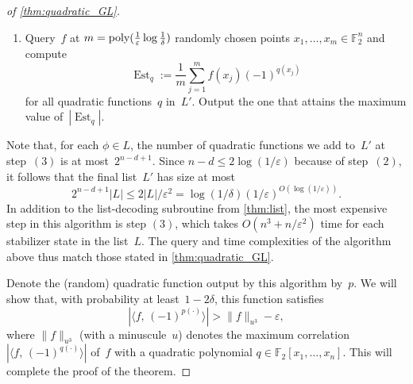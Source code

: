 \documentclass[10pt,a4paper]{amsart}
\DeclareMathOperator{\Est}{Est}
\newcommand{\F}{\mathbb{F}} %
\newcommand{\eps}{\varepsilon}
\newcommand{\pmset}[1]{\{-1,1\}^{#1}} %
\newcommand{\poly}{\mbox{\rm poly}}
\begin{document}
\begin{proof}[ of \cref{thm:quadratic_GL}]
\begin{enumerate}
\begin{itemize}
        \item[$(b)$] If $c\notin V^\perp$, let $U = \{c\}^\perp$ and let $v\in \F_2^n$ satisfy $c\cdot v = 1$, so that any $x\in\F_2^n$ has a unique representation of the form $x = z+bv$ for some $z\in U$ and $b\in \F_2$.
        By evaluating the map $x = z+bv \mapsto i^{|c\circ z| - 2|c\circ z\circ bv|}$ on all vectors $x\in \F_2^n$ with weight $|x| \leq 2$, find the polynomial $r\in \F_2[x_1,\dots,x_n]$ of degree at most~2 such that\footnote{Such a polynomial exists because the function $x = z+bv \mapsto i^{|c\circ z| - 2|c\circ z\circ bv|}$ is a non-classical quadratic phase function taking values in $\pmset{}$, and thus equals a classical quadratic phase $(-1)^{r(x)}$.}
        $(-1)^{r(z+bv)} = i^{|c\circ z| - 2|c\circ z\circ bv|}$.
        Add to~$L'$ the quadratic functions
        $$x\mapsto r(x)+q(x)+y\cdot x \quad \text{and} \quad x\mapsto r(x)+q(x)+ (y+c)\cdot x$$
        for all $y\in V^{\perp}$.
    \end{itemize}
    
    \item Query~$f$ at $m = \poly(\tfrac{1}{\eps} \log \tfrac{1}{\delta})$ randomly chosen points $x_1, \dots, x_m \in \F_2^n$ and compute
    $$\Est_q := \frac{1}{m} \sum_{j=1}^m f(x_j) (-1)^{q(x_j)}$$
    for all quadratic functions~$q$ in~$L'$.
    Output the one that attains the maximum value of~$|\Est_q|$.
\end{enumerate}

Note that, for each $\phi\in L$, the number of quadratic functions we add to~$L'$ at step~$(3)$ is at most~$2^{n-d+1}$.
Since $n-d \leq 2\log(1/\eps)$ because of step~$(2)$, it follows that the final list~$L'$ has size at most
$$2^{n-d+1} |L| \leq 2|L|/\eps^2 = \log(1/\delta) (1/\eps)^{O(\log(1/\eps))}.$$
In addition to the list-decoding subroutine from \cref{thm:list}, the most expensive step in this algorithm is step $(3)$, which takes $O(n^3 + n/\eps^2)$ time for each stabilizer state in the list~$L$.
The query and time complexities of the algorithm above thus match those stated in \cref{thm:quadratic_GL}.

Denote the (random) quadratic function output by this algorithm by~$p$.
We will show that, with probability at least~$1-2\delta$, this function satisfies
\begin{equation} \label{eq:high_corr}
    |\langle f,\, (-1)^{p(\cdot)}\rangle| > \|f\|_{u^3} - \eps,
\end{equation}
where $\|f\|_{u^3}$ (with a minuscule~$u$) denotes the maximum correlation $|\langle f,\, (-1)^{q(\cdot)}\rangle|$ of~$f$ with a quadratic polynomial $q\in \F_2[x_1, \dots, x_n]$.
This will complete the proof of the theorem.


\end{proof}
\end{document}
